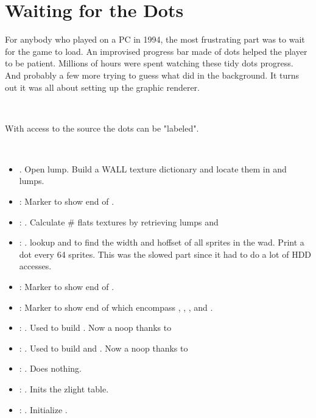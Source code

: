 \section{Waiting for the Dots}
\label{dots_explained}
For anybody who played \doom{} on a PC in 1994, the most frustrating part was to wait for the game to load. An improvised progress bar made of dots helped the player to be patient. Millions of hours were spent watching these tidy dots progress. And probably a few more trying to guess what  did in the background. It turns out it was all about setting up the graphic renderer.\\
\par
{}\\
\par
With access to the source the dots can be "labeled".\\
\par
{}\\
\par
\begin{itemize}
\item {} . Open  lump. Build a WALL texture dictionary and locate them in  and  lumps.
\item {}: Marker to show end of .
\item {}: . Calculate \# flats textures by retrieving lumps  and 
\item {}: . lookup  and  to find the width and hoffset of all sprites in the wad. Print a dot every 64 sprites. This was the slowed part since it had to do a lot of HDD accesses.
\item {}: Marker to show end of . 
\item {}: Marker to show end of  which encompass  , , , and .
\item {}: . Used to build . Now a noop thanks to 
\item {}: . Used to build  and . Now a noop thanks to 
\item {}: . Does nothing. 
\item {}: . Inits the zlight table.
\item {}: . Initialize .
\end{itemize}

